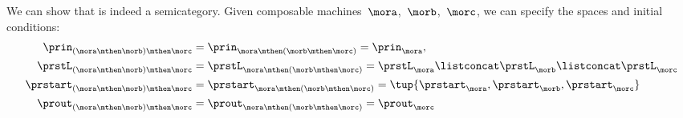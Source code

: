     We can show that \Moore is indeed a semicategory.
    Given composable machines~$\mora$,~$\morb$,~$\morc$, we can specify the spaces and initial conditions:
    \begin{equation*}
        \label{eq:moore_assoc_spaces}
        \begin{aligned}
            \prin_{(\mora \mthen \morb)\mthen \morc}    & =\prin_{\mora \mthen (\morb \mthen \morc)}=\prin_{\mora}, \\
            \prstL_{(\mora \mthen \morb)\mthen \morc}   & =\prstL_{\mora \mthen (\morb \mthen \morc)}=  \prstL_{\mora} \listconcat \prstL_{\morb} \listconcat  \prstL_{\morc} \\
            \prstart_{(\mora \mthen \morb)\mthen \morc} & =\prstart_{\mora \mthen (\morb \mthen \morc)}=\tup{\prstart_\mora,\prstart_\morb,\prstart_\morc} \\
            \prout_{(\mora \mthen \morb)\mthen \morc}   & =\prout_{\mora \mthen (\morb \mthen \morc)}=\prout_\morc
        \end{aligned}
    \end{equation*}

